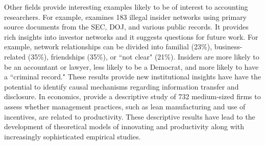 \documentclass[11pt,reqno,titlepage]{amsart}
\begin{document}
\begin{doublespace}
Other fields provide interesting examples likely to be of interest to accounting researchers.
For example, \citet{Ahern:2014id} examines 183 illegal insider networks using primary source documents from the SEC, DOJ, and various public records. 
It provides rich insights into investor networks and it suggests questions for future work.
For example, network relationships can be divided into familial (23\%), business-related (35\%), friendships (35\%), or ``not clear" (21\%).
Insiders are more likely to be an accountant or lawyer, less likely to be a Democrat, and more likely to have a ``criminal record."
These results provide new institutional insights have have the potential to identify causal mechanisms regarding information transfer and disclosure.
In economics, \citet{Bloom:2007ed} provide a descriptive study of 732 medium-sized firms to assess whether management practices, such as lean manufacturing and use of incentives, are related to productivity. These descriptive results have lead to the development of theoretical models of innovating and productivity along with increasingly sophisticated empirical studies.




%
%
%


\end{doublespace}
\end{document}
